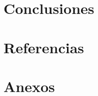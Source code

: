 \documentclass[11pt, letterpaper]{article}
\begin{document}
\newpage
	
\section{Conclusiones}
	
\newpage

	
\section{Referencias}  %

\newpage
	
\section{Anexos}	
\end{document}

